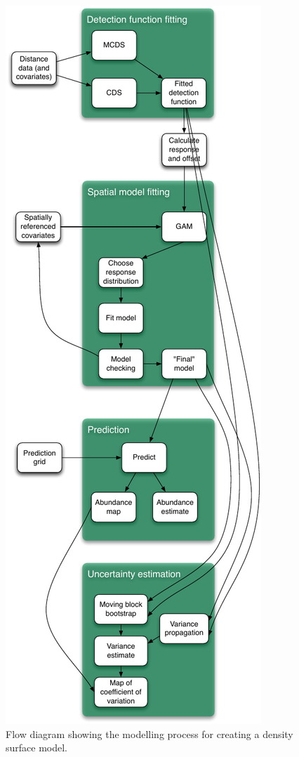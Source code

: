 \documentclass[a4paper,12pt]{article}
\begin{document}
\begin{figure}[h!]
  \caption{Flow diagram showing the modelling process for creating a density surface model.}
  \label{flow}
  \begin{center}
    \includegraphics[height=\textheight]{figs/flowdiagram-reduced}
  \end{center}
\end{figure}
\end{document}
